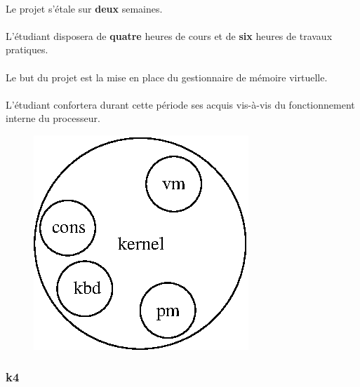 \documentclass[10pt,a4wide]{article}
\begin{document}
\paragraph{}

Le projet s'\'etale sur \textbf{deux} semaines.

\paragraph{}

L'\'etudiant disposera de \textbf{quatre} heures de cours et de \textbf{six}
heures de travaux pratiques.

\paragraph{}

Le but du projet est la mise en place du gestionnaire de m\'emoire virtuelle.

\paragraph{}

L'\'etudiant confortera durant cette p\'eriode ses acquis vis-\`a-vis du
fonctionnement interne du processeur.

\vspace{5cm}

\begin{figure}[h]
\centerline{\includegraphics{figures/k3.eps}}
\end{figure}

\newpage

\subsubsection{k4}
\end{document}
